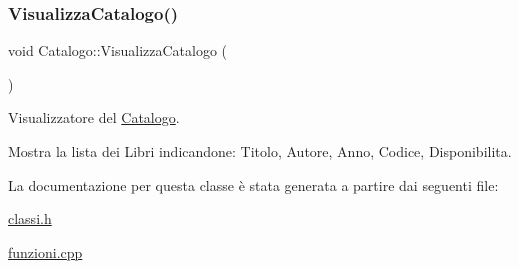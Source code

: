 \subsubsection{\texorpdfstring{Visualizza\+Catalogo()}{VisualizzaCatalogo()}}
{\footnotesize\ttfamily void Catalogo\+::\+Visualizza\+Catalogo (\begin{DoxyParamCaption}{ }\end{DoxyParamCaption})}



Visualizzatore del \mbox{\hyperlink{class_catalogo}{Catalogo}}. 

Mostra la lista dei Libri indicandone\+: Titolo, Autore, Anno, Codice, Disponibilita\textquotesingle{}. 

La documentazione per questa classe è stata generata a partire dai seguenti file\+:\begin{DoxyCompactItemize}
\item 
\mbox{\hyperlink{classi_8h}{classi.\+h}}\item 
\mbox{\hyperlink{funzioni_8cpp}{funzioni.\+cpp}}\end{DoxyCompactItemize}
